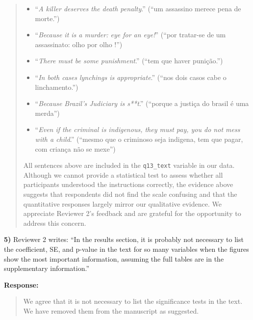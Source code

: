 \documentclass[a4paper,12pt]{article}
\begin{document}
\begin{quote}
\begin{itemize}
  \item ``\textit{A killer deserves the death penalty}.'' (``um assassino merece pena de morte.'')
  \item ``\textit{Because it is a murder: eye for an eye!}'' (``por tratar-se de um assassinato: olho por olho !'')
  \item ``\textit{There must be some punishment}.'' (``tem que haver punição.'')
  \item ``\textit{In both cases lynchings is appropriate}.'' (``nos dois casos cabe o linchamento.'')
  \item ``\textit{Because Brazil's Judiciary is s**t}.'' (``porque a justiça do brasil é uma merda'')
  \item ``\textit{Even if the criminal is indigenous, they must pay, you do not mess with a child}.'' (``mesmo que o criminoso seja indigena, tem que pagar, com criança não se mexe'')
\end{itemize}

All sentences above are included in the \texttt{q13\_text} variable in our
data. Although we cannot provide a statistical test to assess whether all
participants understood the instructions correctly, the evidence above suggests
that respondents did not find the scale confusing and that the quantitative
responses largely mirror our qualitative evidence. We appreciate Reviewer 2's
feedback and are grateful for the opportunity to address this concern.

\end{quote}

\vspace{.3cm}

\noindent \textbf{5)} Reviewer 2 writes: ``In the results section, it is
probably not necessary to list the coefficient, SE, and p-value in the text for
so many variables when the figures show the most important information,
assuming the full tables are in the supplementary information.'' 

\vspace{.3cm}

\noindent \textbf{Response:} 
\begin{quote}

We agree that it is not necessary to list the significance tests in the text.
We have removed them from the manuscript as suggested.

\end{quote}

\vspace{.3cm}
\end{document}
